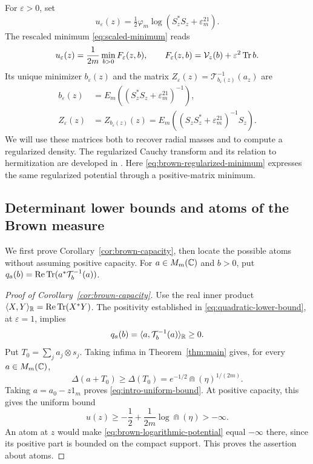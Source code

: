 For $\varepsilon>0$, set
\begin{equation}\label{eq:spectral-potential}
 u_\varepsilon(z)=\tfrac12\varphi_m
                   \log(S_z^*S_z+\varepsilon^21_m).
\end{equation}
The rescaled minimum \eqref{eq:scaled-minimum} reads
\begin{equation}\label{eq:brown-regularized-minimum}
 u_\varepsilon(z)=\frac1{2m}\min_{b>0}F_\varepsilon(z,b),
 \qquad F_\varepsilon(z,b)=\mathcal V_z(b)+\varepsilon^2\operatorname{Tr} b.
\end{equation}
Its unique minimizer $b_\varepsilon(z)$ and the matrix $Z_\varepsilon(z)=\mathcal T_{b_\varepsilon(z)}^{-1}(a_z)$ are
\begin{equation}\label{eq:brown-regularized-optimizer}
 \begin{split}
 b_\varepsilon(z)&=E_m((S_z^*S_z+\varepsilon^21_m)^{-1}),\\
 Z_\varepsilon(z)&=Z_{b_\varepsilon(z)}(z)
     =E_m((S_zS_z^*+\varepsilon^21_m)^{-1}S_z).
 \end{split}
\end{equation}
We will use these matrices both to recover radial masses and to compute a regularized density.
The regularized Cauchy transform and its relation to hermitization are developed in \cite[arXiv version, Sections~2.1.6 and~2.2]{BSS18}.
Here \eqref{eq:brown-regularized-minimum} expresses the same regularized potential through a positive-matrix minimum.

\subsection{Determinant lower bounds and atoms of the Brown measure}
\label{subsec:brown-atoms}
We first prove Corollary~\ref{cor:brown-capacity}, then locate the possible atoms without assuming positive capacity.
For $a\in M_m(\mathbb C)$ and $b>0$, put $q_a(b)=\operatorname{Re}\operatorname{Tr}(a^*\mathcal T_b^{-1}(a))$.

\begin{proof}[Proof of Corollary~\ref{cor:brown-capacity}]
Use the real inner product $\langle X,Y\rangle_{\mathbb R}=\operatorname{Re}\operatorname{Tr}(X^*Y)$.
The positivity established in \eqref{eq:quadratic-lower-bound}, at $\varepsilon=1$, implies
\[
 q_a(b)=\langle a,\mathcal T_b^{-1}(a)\rangle_{\mathbb R}\ge0.
\]
Put $T_0=\sum_j a_j\otimes s_j$.
Taking infima in Theorem~\ref{thm:main} gives, for every $a\in M_m(\mathbb C)$,
\begin{equation}\label{eq:brown-capacity-lower-bound}
 \Delta(a+T_0)\ge\Delta(T_0)
               =e^{-1/2}\Cap(\eta)^{1/(2m)}.
\end{equation}
Taking $a=a_0-z1_m$ proves \eqref{eq:intro-uniform-bound}.
At positive capacity, this gives the uniform bound
\[
 u(z)\ge -\frac12+\frac1{2m}\log\Cap(\eta)>-\infty.
\]
An atom at $z$ would make \eqref{eq:brown-logarithmic-potential} equal $-\infty$ there, since its positive part is bounded on the compact support.
This proves the assertion about atoms.
\end{proof}


